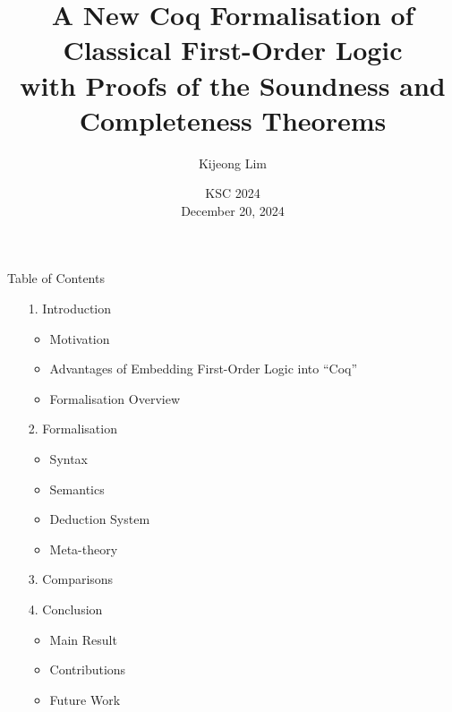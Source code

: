 \documentclass[serif,table,10pt]{beamer}
\date[December 20, 2024]{KSC 2024 \\{December 20, 2024}}
\title[]{\large
A New Coq Formalisation of Classical First-Order Logic \\
with Proofs of the Soundness and Completeness Theorems \\
}
\author[K.~Lim]{Kijeong Lim}
\institute{Chonnam National University}
\newcommand{\0}{\texttt{0}}
\newcommand{\1}{\texttt{1}}
\begin{document}
\frame{\titlepage}

\begin{frame}{Table of Contents}

\begin{enumerate}
    \item[{1.}] Introduction
        \begin{itemize} \small
            \item Motivation
            \item Advantages of Embedding First-Order Logic into ``Coq''
            \item Formalisation Overview
        \end{itemize}
    \item[{2.}] Formalisation
        \begin{itemize} \small
            \item Syntax
            \item Semantics
            \item Deduction System
            \item Meta-theory
        \end{itemize}
    \item[{3.}] Comparisons
    \item[{4.}] Conclusion
        \begin{itemize} \small
            \item Main Result
            \item Contributions
            \item Future Work
        \end{itemize}
\end{enumerate}

\end{frame}
\end{document}
